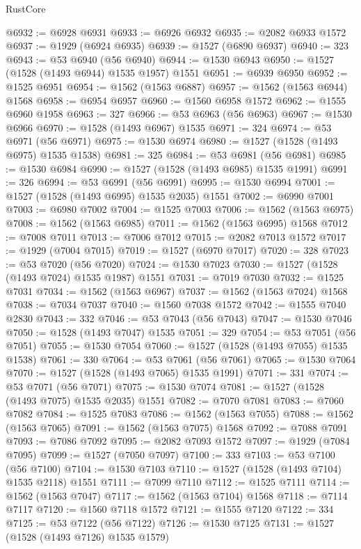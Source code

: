 \begin{lexlean}{RustCore}
\begin{coremodule}
@6932 := @6928 @6931
@6933 := @6926 @6932
@6935 := @2082 @6933 @1572
@6937 := @1929 (@6924 @6935)
@6939 := @1527 (@6890 @6937)
@6940 := 323
@6943 := @53 @6940 (@56 @6940)
@6944 := @1530 @6943
@6950 := @1527 (@1528 (@1493 @6944) @1535 @1957) @1551
@6951 := @6939 @6950
@6952 := @1525 @6951
@6954 := @1562 (@1563 @6887)
@6957 := @1562 (@1563 @6944) @1568
@6958 := @6954 @6957
@6960 := @1560 @6958 @1572
@6962 := @1555 @6960 @1958
@6963 := 327
@6966 := @53 @6963 (@56 @6963)
@6967 := @1530 @6966
@6970 := @1528 (@1493 @6967) @1535
@6971 := 324
@6974 := @53 @6971 (@56 @6971)
@6975 := @1530 @6974
@6980 := @1527 (@1528 (@1493 @6975) @1535 @1538)
@6981 := 325
@6984 := @53 @6981 (@56 @6981)
@6985 := @1530 @6984
@6990 := @1527 (@1528 (@1493 @6985) @1535 @1991)
@6991 := 326
@6994 := @53 @6991 (@56 @6991)
@6995 := @1530 @6994
@7001 := @1527 (@1528 (@1493 @6995) @1535 @2035) @1551
@7002 := @6990 @7001
@7003 := @6980 @7002
@7004 := @1525 @7003
@7006 := @1562 (@1563 @6975)
@7008 := @1562 (@1563 @6985)
@7011 := @1562 (@1563 @6995) @1568
@7012 := @7008 @7011
@7013 := @7006 @7012
@7015 := @2082 @7013 @1572
@7017 := @1929 (@7004 @7015)
@7019 := @1527 (@6970 @7017)
@7020 := 328
@7023 := @53 @7020 (@56 @7020)
@7024 := @1530 @7023
@7030 := @1527 (@1528 (@1493 @7024) @1535 @1987) @1551
@7031 := @7019 @7030
@7032 := @1525 @7031
@7034 := @1562 (@1563 @6967)
@7037 := @1562 (@1563 @7024) @1568
@7038 := @7034 @7037
@7040 := @1560 @7038 @1572
@7042 := @1555 @7040 @2830
@7043 := 332
@7046 := @53 @7043 (@56 @7043)
@7047 := @1530 @7046
@7050 := @1528 (@1493 @7047) @1535
@7051 := 329
@7054 := @53 @7051 (@56 @7051)
@7055 := @1530 @7054
@7060 := @1527 (@1528 (@1493 @7055) @1535 @1538)
@7061 := 330
@7064 := @53 @7061 (@56 @7061)
@7065 := @1530 @7064
@7070 := @1527 (@1528 (@1493 @7065) @1535 @1991)
@7071 := 331
@7074 := @53 @7071 (@56 @7071)
@7075 := @1530 @7074
@7081 := @1527 (@1528 (@1493 @7075) @1535 @2035) @1551
@7082 := @7070 @7081
@7083 := @7060 @7082
@7084 := @1525 @7083
@7086 := @1562 (@1563 @7055)
@7088 := @1562 (@1563 @7065)
@7091 := @1562 (@1563 @7075) @1568
@7092 := @7088 @7091
@7093 := @7086 @7092
@7095 := @2082 @7093 @1572
@7097 := @1929 (@7084 @7095)
@7099 := @1527 (@7050 @7097)
@7100 := 333
@7103 := @53 @7100 (@56 @7100)
@7104 := @1530 @7103
@7110 := @1527 (@1528 (@1493 @7104) @1535 @2118) @1551
@7111 := @7099 @7110
@7112 := @1525 @7111
@7114 := @1562 (@1563 @7047)
@7117 := @1562 (@1563 @7104) @1568
@7118 := @7114 @7117
@7120 := @1560 @7118 @1572
@7121 := @1555 @7120
@7122 := 334
@7125 := @53 @7122 (@56 @7122)
@7126 := @1530 @7125
@7131 := @1527 (@1528 (@1493 @7126) @1535 @1579)

\end{coremodule}
\end{lexlean}
